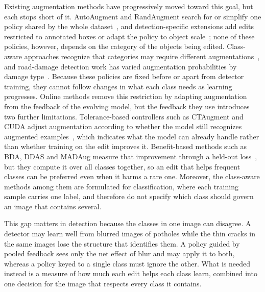 Existing augmentation methods have progressively moved toward this goal, but each stops short of it. AutoAugment and RandAugment search for or simplify one policy shared by the whole dataset~\cite{cubuk2019auto,cubuk2020rand}, and detection-specific extensions add edits restricted to annotated boxes or adapt the policy to object scale~\cite{zoph2020det,chen2021scale}; none of these policies, however, depends on the category of the objects being edited. Class-aware approaches recognize that categories may require different augmentations~\cite{tsuchiya2019,yoo2023,cheung2022adaaug}, and road-damage detection work has varied augmentation probabilities by damage type~\cite{rdd_detectron2}. Because these policies are fixed before or apart from detector training, they cannot follow changes in what each class needs as learning progresses. Online methods remove this restriction by adapting augmentation from the feedback of the evolving model, but the feedback they use introduces two further limitations. Tolerance-based controllers such as CTAugment and CUDA adjust augmentation according to whether the model still recognizes augmented examples~\cite{berthelot2020,ahn2023cuda}, which indicates what the model can already handle rather than whether training on the edit improves it. Benefit-based methods such as BDA, DDAS and MADAug measure that improvement through a held-out loss~\cite{lu2023bda,liu2021ddas,hou2023madaug}, but they compute it over all classes together, so an edit that helps frequent classes can be preferred even when it harms a rare one. Moreover, the class-aware methods among them are formulated for classification, where each training sample carries one label, and therefore do not specify which class should govern an image that contains several.

This gap matters in detection because the classes in one image can disagree. A detector may learn well from blurred images of potholes while the thin cracks in the same images lose the structure that identifies them. A policy guided by pooled feedback sees only the net effect of blur and may apply it to both, whereas a policy keyed to a single class must ignore the other. What is needed instead is a measure of how much each edit helps each class learn, combined into one decision for the image that respects every class it contains.

